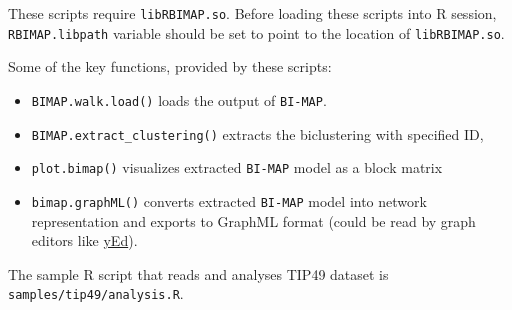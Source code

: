 \documentclass[microtype,a4paper,article,10pt,oneside,final]{memoir}
\newcommand{\bimap}{\texttt{BI-MAP}\xspace}
\begin{document}
These scripts require \texttt{libRBIMAP.so}.
Before loading these scripts into R session,
\texttt{RBIMAP.libpath} variable should be set to point to the location of \texttt{libRBIMAP.so}.

Some of the key functions, provided by these scripts:
\begin{itemize}
\item \texttt{BIMAP.walk.load()} loads the output of \bimap.
\item \texttt{BIMAP.extract\_clustering()} extracts the biclustering with specified ID,
\item \texttt{plot.bimap()} visualizes extracted \bimap model as a block matrix
\item \texttt{bimap.graphML()} converts extracted \bimap model into network representation and exports to GraphML format
(could be read by graph editors like \href{http://yed.yworks.com}{yEd}).
\end{itemize}

The sample R script that reads and analyses TIP49 dataset is \texttt{samples/tip49/analysis.R}.
\end{document}
